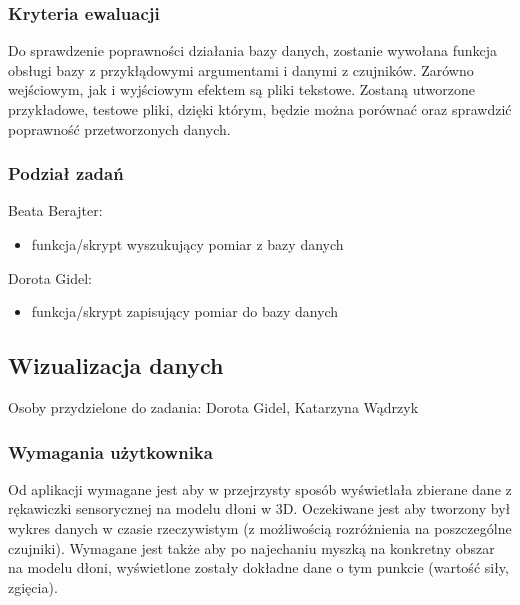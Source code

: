 \documentclass{article}
\begin{document}
\subsubsection{Kryteria ewaluacji}
Do sprawdzenie poprawności działania bazy danych, zostanie wywołana funkcja obsługi bazy z przykłądowymi argumentami i danymi z czujników. Zarówno wejściowym, jak i wyjściowym efektem są pliki tekstowe. Zostaną utworzone przykładowe, testowe pliki, dzięki którym, będzie można porównać oraz sprawdzić poprawność przetworzonych danych.
\subsubsection{Podział zadań}
Beata Berajter:
\begin{itemize}
    \item funkcja/skrypt wyszukujący pomiar z bazy danych
\end{itemize}
Dorota Gidel:
\begin{itemize}
    \item funkcja/skrypt zapisujący pomiar do bazy danych
\end{itemize}

\subsection{Wizualizacja danych}
Osoby przydzielone do zadania: Dorota Gidel, Katarzyna Wądrzyk
\subsubsection{Wymagania użytkownika}
Od aplikacji wymagane jest aby w przejrzysty sposób wyświetlała zbierane dane z rękawiczki sensorycznej na modelu dłoni w 3D. Oczekiwane jest aby tworzony był wykres danych w czasie rzeczywistym (z możliwością rozróżnienia na poszczególne czujniki). Wymagane jest także aby po najechaniu myszką na konkretny obszar na modelu dłoni, wyświetlone zostały dokładne dane o tym punkcie (wartość siły, zgięcia).
\end{document}
